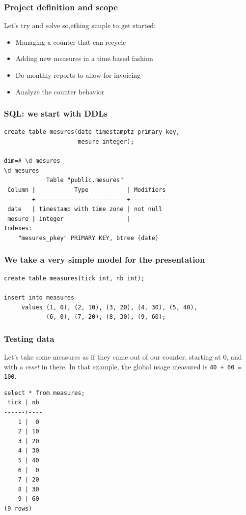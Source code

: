 \documentclass{beamer}
\begin{document}
\begin{frame}[fragile]
  \frametitle{Project definition and scope}

  Let's try and solve so,ething simple to get started:

  \begin{itemize}
    \item<1-> Managing a counter that can recycle
    \item<2-> Adding new measures in a time based fashion
    \item<3-> Do monthly reports to allow for invoicing
    \item<4-> Analyze the counter behavior
  \end{itemize}
\end{frame}

\begin{frame}[fragile]
  \frametitle{SQL: we start with DDLs}

  \vfill

\begin{example}[DDL]
\begin{verbatim}
create table mesures(date timestamptz primary key,
                     mesure integer);

dim=# \d mesures
\d mesures
            Table "public.mesures"
 Column |           Type           | Modifiers 
--------+--------------------------+-----------
 date   | timestamp with time zone | not null
 mesure | integer                  | 
Indexes:
    "mesures_pkey" PRIMARY KEY, btree (date)
\end{verbatim}
\end{example}
\end{frame}

\begin{frame}[fragile]
  \frametitle{We take a very simple model for the presentation}

\begin{verbatim}
create table measures(tick int, nb int);

insert into measures
     values (1, 0), (2, 10), (3, 20), (4, 30), (5, 40),
            (6, 0), (7, 20), (8, 30), (9, 60);
\end{verbatim}
\end{frame}

\begin{frame}[fragile]
  \frametitle{Testing data}

  Let's take some measures as if they came out of our counter, starting at
  0, and with a \textit{reset} in there. In that example, the global usage
  measured is \texttt{40 + 60 = 100}.

\begin{verbatim}
select * from measures;
 tick | nb 
------+----
    1 |  0
    2 | 10
    3 | 20
    4 | 30
    5 | 40
    6 |  0
    7 | 20
    8 | 30
    9 | 60
(9 rows)
\end{verbatim}
\end{frame}
\end{document}
